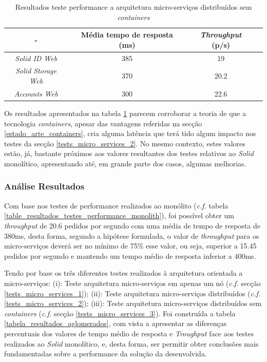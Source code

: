 \begin{table}[h]
\centering
\caption{Resultados teste performance a arquitetura micro-serviços distribuídos sem \emph{containers}}
\label{r_t_m_s_3}
\vspace{0.5cm}
\begin{tabular}{c|c|c|c} 
 - & Média tempo de resposta (ms) & \emph{Throughput} (p/s) \\
\hline                          
\emph{Solid ID Web} & 385 & 19 \\
\emph{Solid Storage Web} & 370 & 20.2 \\
\emph{Accounts Web} & 300 & 22.6 \\
\end{tabular}
\end{table}

Os resultados apresentados na tabela \ref{r_t_m_s_3} parecem corroborar a teoria de que a tecnologia \emph{containers}, apesar das vantagens referidas na secção \ref{estado_arte_containers}, cria alguma latência que terá tido algum impacto nos testes da secção \ref{tests_micro_services_2}. No mesmo contexto, estes valores estão, já, bastante próximos aos valores resultantes dos testes relativos ao \emph{Solid} monolítico, apresentando até, em grande parte dos casos, algumas melhorias.

\subsubsection{Análise Resultados}
Com base nos testes de performance realizados ao monólito (\emph{c.f.} tabela \ref{table_resultados_testes_performance_monolith}), foi possível obter um \emph{throughput} de 20.6 pedidos por segundo com uma média de tempo de resposta de 380ms, desta forma, segundo a hipótese formulada, o valor de \emph{throughput} para os micro-serviços deverá ser no mínimo de 75\% esse valor, ou seja, superior a 15.45 pedidos por segundo e mantendo um tempo médio de resposta inferior a 400ms.

Tendo por base os três diferentes testes realizados à arquitetura orientada a micro-serviços: (i): Teste arquitetura micro-serviços em apenas um nó (\emph{c.f.} secção \ref{tests_micro_services_1}); (ii): Teste arquitetura micro-serviços distribuídos (\emph{c.f.}\ref{tests_micro_services_2}); (iii): Teste arquitetura micro-serviços distribuídos sem \emph{containers} (\emph{c.f.} secção \ref{tests_micro_services_3}).
Foi construída a tabela \ref{tabela_resultados_aglomerados}, com vista a apresentar as diferenças percentuais dos valores de tempo médio de resposta e \emph{Troughput} face aos testes realizados ao \emph{Solid} monolítico, e, desta forma, ser permitir obter conclusões mais fundamentadas sobre a performance da solução da desenvolvida.

